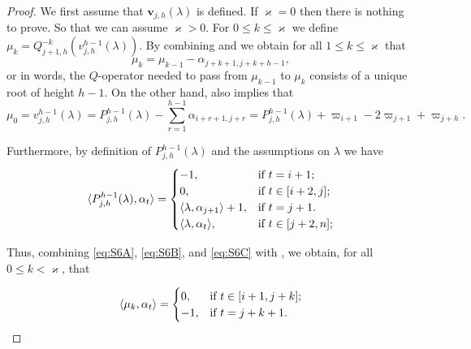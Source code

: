 \begin{proof}
We first assume that $\mathbf{v}_{j,h}(\lambda)$ is defined.
If $\varkappa=0$ then  there is nothing to prove.
So that  we can assume $\varkappa>0$.
For $0 \leq k \leq \varkappa$ we define $\mu_k = Q^{-k}_{j+1,h}(v^{h-1}_{j,h}(\lambda))$. 
By combining  and   we obtain for all $1\leq k \leq \varkappa$ that 
\begin{equation} \label{eq:S6A}
    \mu_k = \mu_{k-1} - \alpha_{j+k+1,j+k+h-1}, 
\end{equation}
or in  words, the $Q$-operator needed to pass from $\mu_{k-1} $ to $\mu_k$ consists of a unique root of height $h-1$. 
On the other hand,   also implies that
\begin{equation}\label{eq:S6B}
  \mu_0= v^{h-1}_{j,h}(\lambda) = P^{h-1}_{j,h}(\lambda) - \sum_{r=1}^{h-1}\alpha_{i+r+1,j+r} =  P^{h-1}_{j,h}(\lambda) +\varpi_{i+1} -2\varpi_{j+1} +\varpi_{j+h}.
\end{equation}

Furthermore, by definition of $P^{h-1}_{j,h}(\lambda)$  and the assumptions on $\lambda$ we have 
\begin{equation}\label{eq:S6C}
    \langle P_{j,h}^{h-1}(\lambda) , \alpha_t \rangle = \begin{cases}
    -1, & \mbox{if } t=i+1;\\
    0, & \mbox{if } t \in [i+2,j];\\
    \langle \lambda , \alpha_{j+1} \rangle +1, & \mbox{if }  t=j+1.\\
        \langle \lambda , \alpha_t \rangle, & \mbox{if } t\in [j+2,n];\\ 
    \end{cases}
\end{equation}                                                                                                                                                                                                                                                                                                             

Thus, combining \eqref{eq:S6A}, \eqref{eq:S6B}, and \eqref{eq:S6C} with , we obtain, for all 
$0\leq k<\varkappa$, that

\begin{equation}\label{eqS6 mu versus alpha}
\langle \mu_k , \alpha_t \rangle = \begin{cases}
    0, & \mbox{if } t\in [i+1, j+k];\\
    -1,& \mbox{if } t=j+k+1.
\end{cases}
\end{equation}




\end{proof}
